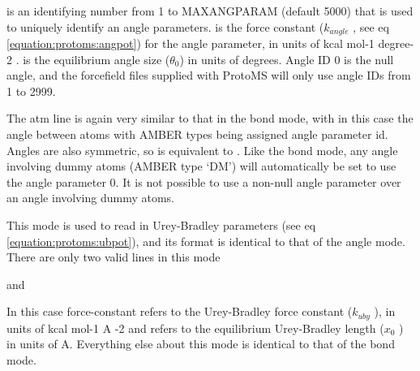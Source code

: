\documentclass[letterpaper,10pt,english]{sphinxmanual}
\begin{document}
 is an identifying number from 1 to MAXANGPARAM (default 5000) that is used to uniquely identify an angle parameters.  is the force constant (\(k_{angle}\) , see eq \eqref{equation:protoms:angpot}) for the angle parameter, in units of kcal mol-1 degree-2 .  is the equilibrium angle size (\(\theta_0\)) in units of degrees. Angle ID 0 is the null angle, and the forcefield files supplied with ProtoMS will only use angle IDs from 1 to 2999.

The atm line is again very similar to that in the bond mode, with in this case the angle between atoms with AMBER types  being assigned angle parameter id. Angles are also symmetric, so  is equivalent to . Like the bond mode, any angle involving dummy atoms (AMBER type ‘DM’) will automatically be set to use the angle parameter 0. It is not possible to use a non-null angle parameter over an angle involving dummy atoms.

\ignorespaces 
{}

This mode is used to read in Urey-Bradley parameters (see eq \eqref{equation:protoms:ubpot}), and its format is identical to that of the angle mode. There are only two valid lines in this mode

%
\begin{sphinxVerbatim}[commandchars=\\\{\}]
   
\end{sphinxVerbatim}

and

%
\begin{sphinxVerbatim}[commandchars=\\\{\}]
    
\end{sphinxVerbatim}

In this case force-constant refers to the Urey-Bradley force constant (\(k_{uby}\) ), in units of kcal mol-1 A -2 and  refers to the equilibrium Urey-Bradley length (\(x_0\) ) in units of A. Everything else about this mode is identical to that of the bond mode.
\end{document}
